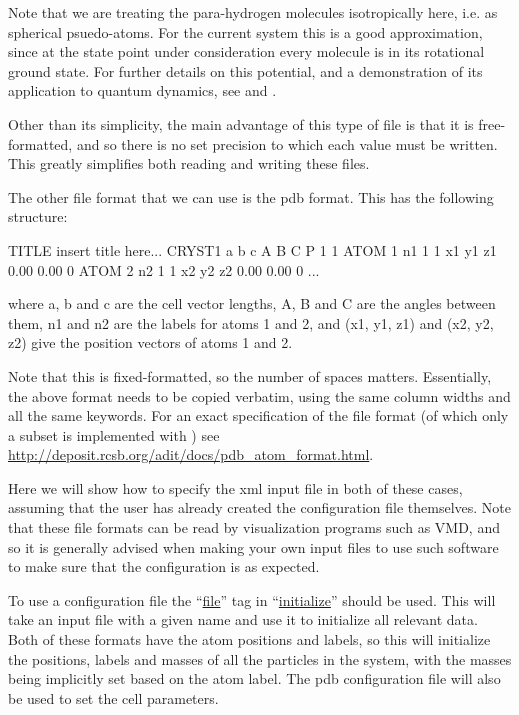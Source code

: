 \documentclass[11pt,english,fleqn]{report}
\newenvironment{code}{%
\footnotesize 
\verbatim
}{
\endverbatim
\normalsize
}
\begin{document}
Note that we are treating the para-hydrogen molecules isotropically here,
i.e. as spherical psuedo-atoms.
For the current system this is a good approximation, since at 
the state point under consideration every molecule is in its 
rotational ground state. For further details on this potential,
and a demonstration of its application to quantum dynamics, see
\cite{silv-gold78jcp} and \cite{mill-mano05jcp}.

Other than its simplicity, the main advantage of this type of file
is that it is free-formatted, and so there is no set precision
to which each value must be written. This greatly simplifies
both reading and writing these files.

The other file format that we can use is the pdb format. This
has the following structure:

\begin{code}
TITLE insert title here...
CRYST1        a        b        c      A      B      C P 1           1
ATOM      1   n1   1     1          x1      y1      z1  0.00  0.00             0
ATOM      2   n2   1     1          x2      y2      z2  0.00  0.00             0
...
\end{code}
where a, b and c are the cell vector lengths, A, B and C are the angles between
them, n1 and n2 are the labels for atoms 1 and 2, and (x1, y1, z1)
and (x2, y2, z2) give the position vectors of atoms 1 and 2. 

Note that this is
fixed-formatted, so the number of spaces matters. Essentially, the
above format needs to be copied verbatim, using the same column
widths and all the same keywords. For an exact specification
of the file format (of which only a subset is implemented 
with \ipi) see
\url{http://deposit.rcsb.org/adit/docs/pdb_atom_format.html}.

Here we will show how to specify the xml input file
in both of these cases, assuming that the user has already
created the configuration file themselves.
Note that these file formats can be read by
visualization programs such as VMD, and so it is generally advised 
when making your own input files to
use such software to make sure that the configuration is as expected.

To use a configuration file the {}``\hyperref[INITFILE]{file}'' tag in 
{}``\hyperref[INITIALIZER]{initialize}'' should be used.
This will take an input file with a given name and use it to initialize
all relevant data. Both of these formats have the atom
positions and labels, so this will initialize the positions, labels
and masses of all the particles in the system, with the masses being
implicitly set based on the atom label. The pdb configuration file
will also be used to set the cell parameters.
\end{document}
